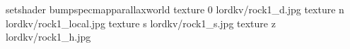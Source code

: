 setshader bumpspecmapparallaxworld
texture 0 lordkv/rock1_d.jpg
texture n lordkv/rock1_local.jpg
texture s lordkv/rock1_s.jpg
texture z lordkv/rock1_h.jpg
